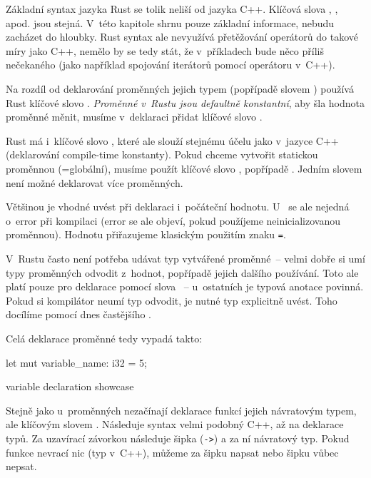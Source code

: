 \documentclass[main.tex]{subfiles}
\begin{document}

Základní syntax jazyka Rust se tolik neliší od jazyka C++. Klíčová slova ,
,  apod. jsou stejná. V~této kapitole shrnu pouze základní
informace, nebudu zacházet do hloubky. Rust syntax ale nevyužívá přetěžování operátorů
do takové míry jako C++, nemělo by se tedy stát, že v~příkladech bude něco příliš
nečekaného (jako například spojování iterátorů pomocí operátoru \icpp{|} v~C++).


Na rozdíl od deklarování proměnných jejich typem (popřípadě slovem ) používá
Rust klíčové slovo . \emph{Proměnné v~Rustu jsou defaultně konstantní}, aby
šla hodnota proměnné měnit, musíme v~deklaraci přidat klíčové slovo .

Rust má i~klíčové slovo , které ale slouží stejnému účelu jako
 v~jazyce C++ (deklarování compile-time konstanty).
Pokud chceme vytvořit statickou proměnnou (=globální), musíme použít klíčové slovo
, popřípadě . Jedním slovem není možné deklarovat více
proměnných.

Většinou je vhodné uvést při deklaraci i~počáteční hodnotu. U~ se ale
nejedná o~error při kompilaci (error se ale objeví, pokud použíjeme neinicializovanou
proměnnou). Hodnotu přiřazujeme klasickým použitím znaku \texttt{=}.
\cite[sekce~3.1]{thebook}

V~Rustu často není potřeba udávat typ vytvářené proměnné~-- velmi dobře si umí typy
proměnných odvodit z~hodnot, popřípadě jejich dalšího používání. Toto ale platí pouze
pro deklarace pomocí slova ~-- u~ostatních je typová anotace povinná. Pokud
si kompilátor neumí typ odvodit, je nutné typ explicitně uvést. Toho docílíme pomocí
dnes častějšího . \cite[sekce~3.2]{thebook}

Celá deklarace proměnné tedy vypadá takto:

\obrazek
\begin{rustcode}
    let mut variable_name: i32 = 5;
\end{rustcode}
{variable declaration showcase}


Stejně jako u~proměnných nezačínají deklarace funkcí jejich návratovým typem, ale
klíčovým slovem . Následuje syntax velmi podobný C++, až na  deklarace typů. Za uzavírací závorkou následuje šipka (\texttt{->}) a za ní
návratový typ. Pokud funkce nevrací nic (typ  v~C++), můžeme za šipku napsat
 \irust{()} nebo šipku vůbec nepsat.
\end{document}
